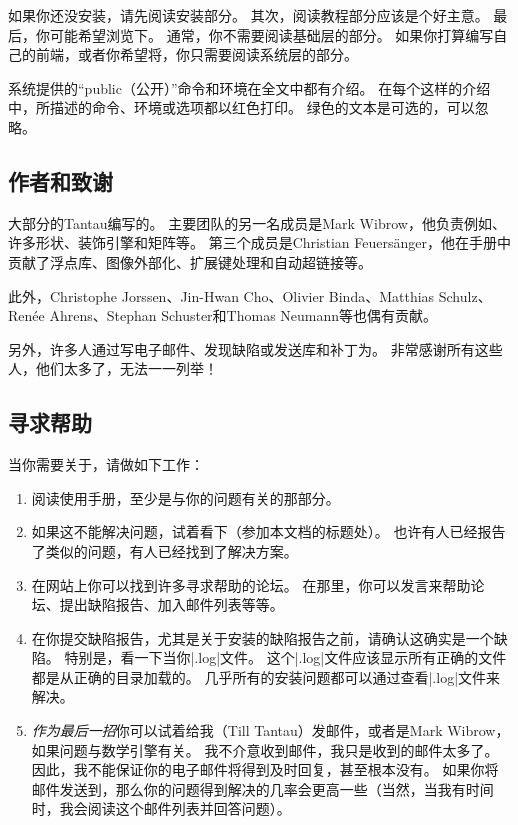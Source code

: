 如果你还没安装\tikzname，请先阅读安装部分。
其次，阅读教程部分应该是个好主意。
最后，你可能希望浏览下。
通常，你不需要阅读基础层的部分。
如果你打算编写自己的前端，或者你希望将，你只需要阅读系统层的部分。

系统提供的“public（公开）”命令和环境在全文中都有介绍。
在每个这样的介绍中，所描述的命令、环境或选项都以红色打印。
绿色的文本是可选的，可以忽略。


\subsection{作者和致谢}
\label{section-authors}

大部分的 Tantau编写的。
主要团队的另一名成员是Mark Wibrow，他负责例如、许多形状、装饰引擎和矩阵等。
第三个成员是Christian Feuers\"anger，他在手册中贡献了浮点库、图像外部化、扩展键处理和自动超链接等。

此外，Christophe Jorssen、Jin-Hwan Cho、Olivier Binda、Matthias Schulz、Ren\'ee Ahrens、Stephan Schuster和Thomas Neumann等也偶有贡献。

另外，许多人通过写电子邮件、发现缺陷或发送库和补丁为。
非常感谢所有这些人，他们太多了，无法一一列举！


\subsection{寻求帮助}

当你需要关于，请做如下工作：

\begin{enumerate}
    \item 阅读使用手册，至少是与你的问题有关的那部分。
    \item 如果这不能解决问题，试着看下（参加本文档的标题处）。
        也许有人已经报告了类似的问题，有人已经找到了解决方案。
    \item 在网站上你可以找到许多寻求帮助的论坛。
        在那里，你可以发言来帮助论坛、提出缺陷报告、加入邮件列表等等。
    \item 在你提交缺陷报告，尤其是关于安装的缺陷报告之前，请确认这确实是一个缺陷。
        特别是，看一下当你|.log|文件。
        这个|.log|文件应该显示所有正确的文件都是从正确的目录加载的。
        几乎所有的安装问题都可以通过查看|.log|文件来解决。
    \item \emph{作为最后一招}你可以试着给我（Till Tantau）发邮件，或者是Mark Wibrow，如果问题与数学引擎有关。
        我不介意收到邮件，我只是收到的邮件太多了。
        因此，我不能保证你的电子邮件将得到及时回复，甚至根本没有。
        如果你将邮件发送到，那么你的问题得到解决的几率会更高一些（当然，当我有时间时，我会阅读这个邮件列表并回答问题）。
\end{enumerate}
